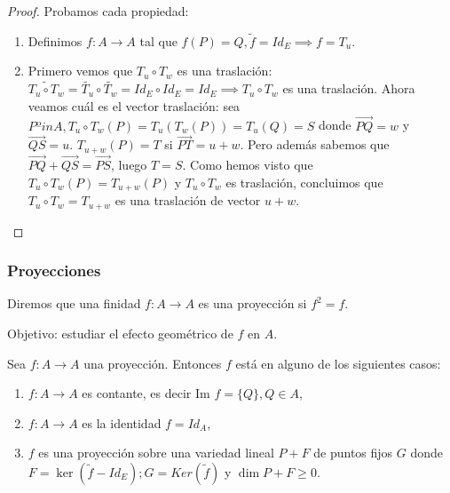 \documentclass[14pt]{book}
\begin{document}
\begin{proof}
	Probamos cada propiedad:
	\begin{enumerate}
		\item Definimos $f: A \to A$ tal que $f(P) = Q, \tilde{f} = Id_E \implies f = T_u$.
		\item Primero vemos que $T_u \circ T_w$ es una traslación: $\widetilde{T_u \circ T_w} = \tilde{T_u} \circ \tilde{T_w} = Id_E \circ Id_E = Id_E \implies T_u \circ T_w$ es una traslación. Ahora veamos cuál es el vector traslación: sea $P ºin A, T_u \circ T_w (P) = T_u (T_w (P)) = T_u (Q) = S$ donde $\overrightarrow{PQ} = w$ y $\overrightarrow{QS} = u$. $T_{u + w}(P) = T$ si $\overrightarrow{PT} = u + w$. Pero además sabemos que $\overrightarrow{PQ} + \overrightarrow{QS} = \overrightarrow{PS}$, luego $T = S$. Como hemos visto que $T_u \circ T_w (P) = T_{u + w}(P)$ y $T_u \circ T_w$ es traslación, concluimos que $T_u \circ T_w = T_{u + w}$ es una traslación de vector $u + w$.
	\end{enumerate}	
\end{proof}

\subsubsection{Proyecciones}
\begin{dfn}
	Diremos que una finidad $f : A \to A$ es una proyección si $f^2 = f$.
\end{dfn}

Objetivo: estudiar el efecto geométrico de $f$ en $A$.
\begin{pro}
	Sea $f: A \to A$ una proyección. Entonces $f$ está en alguno de los siguientes casos:
	\begin{enumerate}
		\item $f: A \to A$ es contante, es decir $\text{Im } f = \{Q\}, Q \in A$,
		\item $f: A \to A$ es la identidad $f = Id_A$,
		\item $f$ es una proyección sobre una variedad lineal $P + F$ de puntos fijos $G$ donde $F = \ker(\tilde{f} - Id_E); G = Ker(\tilde{f})$ y $\dim P + F \geq 0$.
	\end{enumerate}
\end{pro}
\end{document}
